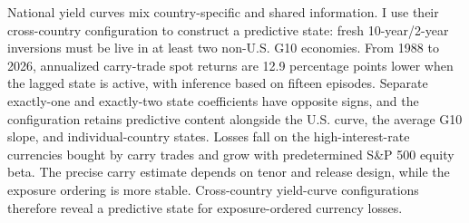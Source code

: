 National yield curves mix country-specific and shared information. I use their cross-country configuration to construct a predictive state: fresh 10-year/2-year inversions must be live in at least two non-U.S. G10 economies. From 1988 to 2026, annualized carry-trade spot returns are 12.9 percentage points lower when the lagged state is active, with inference based on fifteen episodes. Separate exactly-one and exactly-two state coefficients have opposite signs, and the configuration retains predictive content alongside the U.S. curve, the average G10 slope, and individual-country states. Losses fall on the high-interest-rate currencies bought by carry trades and grow with predetermined S\&P 500 equity beta. The precise carry estimate depends on tenor and release design, while the exposure ordering is more stable. Cross-country yield-curve configurations therefore reveal a predictive state for exposure-ordered currency losses.
